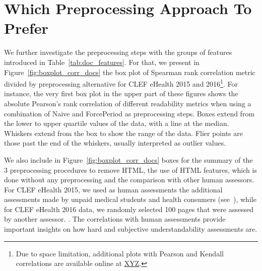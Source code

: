 \section{Which Preprocessing Approach To Prefer}
\label{sec:which_preprocessing}

We further investigate the preprocessing steps with the groups of features introduced in Table~\ref{tab:doc_features}.
For that, we present in Figure~\ref{fig:boxplot_corr_docs} the box plot of Spearman rank correlation metric divided by preprocessing alternative for CLEF eHealth 2015 and 2016\footnote{Due to space limitation, additional plots with Pearson and Kendall correlations are available online at \url{XYZ}.}.
For instance, the very first box plot in the upper part of these figures shows the absolute Pearson's rank correlation of different readability metrics when using a combination of Naive and ForcePeriod as preprocessing steps.
Boxes extend from the lower to upper quartile values of the data, with a line at the median. Whiskers extend from the box to show the range of the data. Flier points are those past the end of the whiskers, usually interpreted as outlier values.

We also include in Figure~\ref{fig:boxplot_corr_docs} 
boxes for the summary of the 3 preprocessing procedures to remove HTML, the use of HTML features, which is done without any preprocessing and the comparison with other human assessors. For CLEF eHealth 2015, we used as human assessments the additional assessments made by unpaid medical students and health consumers (see~\cite{palotti16b}), while for CLEF eHealth 2016 data, we randomly selected 100 pages that were assessed by another assessor. .
The correlations with human assessments provide important insights on how hard and subjective understandability assessments are.


